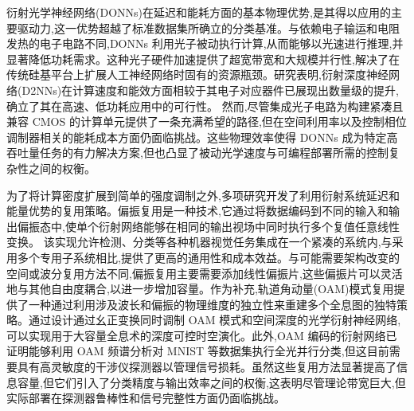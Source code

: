 \documentclass[11pt]{article}
\begin{document}
衍射光学神经网络(DONNs)在延迟和能耗方面的基本物理优势,是其得以应用的主要驱动力,这一优势超越了标准数据集所确立的分类基准。与依赖电子输运和电阻发热的电子电路不同,DONNs 利用光子被动执行计算,从而能够以光速进行推理,并显著降低功耗需求。这种光子硬件加速提供了超宽带宽和大规模并行性,解决了在传统硅基平台上扩展人工神经网络时固有的资源瓶颈。研究表明,衍射深度神经网络(D2NNs)在计算速度和能效方面相较于其电子对应器件已展现出数量级的提升,确立了其在高速、低功耗应用中的可行性。\citep{doi_10_48550_arxiv_2305_03627_fb0d0b27} \citep{s2_e9e6fc7353675c8e70b11e4ba8a931d959c2e912_909a5a0c} 然而,尽管集成光子电路为构建紧凑且兼容 CMOS 的计算单元提供了一条充满希望的路径,但在空间利用率以及控制相位调制器相关的能耗成本方面仍面临挑战。这些物理效率使得 DONNs 成为特定高吞吐量任务的有力解决方案,但也凸显了被动光学速度与可编程部署所需的控制复杂性之间的权衡。\citep{doi_10_1002_lpor_202200348_d54cae18} \citep{doi_10_1109_dac18074_2021_9586204_0c48190f} \citep{doi_10_1038_s41467_022_28702_0_1b79b43c}

为了将计算密度扩展到简单的强度调制之外,多项研究开发了利用衍射系统延迟和能量优势的复用策略。偏振复用是一种技术,它通过将数据编码到不同的输入和输出偏振态中,使单个衍射网络能够在相同的输出视场中同时执行多个复值任意线性变换。\citep{doi_10_1038_s41377_022_00849_x_e31226af} 该实现允许检测、分类等各种机器视觉任务集成在一个紧凑的系统内,与采用多个专用子系统相比,提供了更高的通用性和成本效益。与可能需要架构改变的空间或波分复用方法不同,偏振复用主要需要添加线性偏振片,这些偏振片可以灵活地与其他自由度耦合,以进一步增加容量。作为补充,轨道角动量(OAM)模式复用提供了一种通过利用涉及波长和偏振的物理维度的独立性来重建多个全息图的独特策略。通过设计通过幺正变换同时调制 OAM 模式和空间深度的光学衍射神经网络,可以实现用于大容量全息术的深度可控时空演化。此外,OAM 编码的衍射网络已证明能够利用 OAM 频谱分析对 MNIST 等数据集执行全光并行分类,但这目前需要具有高灵敏度的干涉仪探测器以管理信号损耗。虽然这些复用方法显著提高了信息容量,但它们引入了分类精度与输出效率之间的权衡,这表明尽管理论带宽巨大,但实际部署在探测器鲁棒性和信号完整性方面仍面临挑战。\citep{doi_10_1038_s41377_022_00849_x_e31226af} \citep{doi_10_1364_oe_447337_61ffab71} \citep{doi_10_1117_1_apn_2_6_066006_d88755f0}
\end{document}
